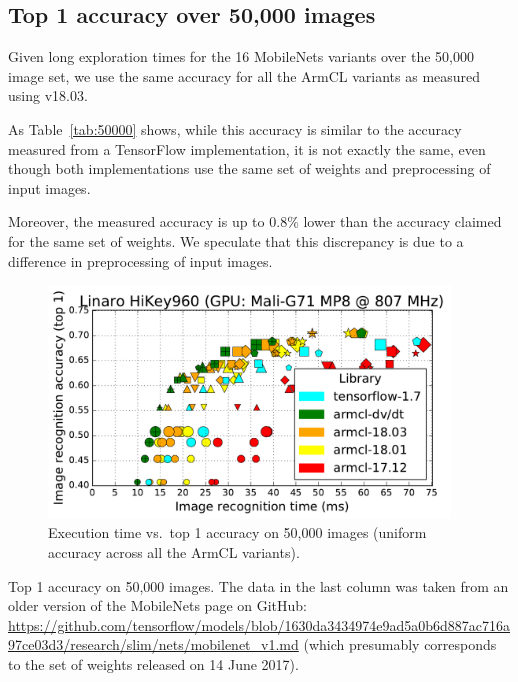 \documentclass[sigplan]{acmart}
\begin{document}
\subsection{Top 1 accuracy over 50,000 images}

Given long exploration times for the 16 MobileNets variants over the 50,000
image set, we use the same accuracy for all the ArmCL variants as measured
using v18.03.

As Table~\ref{tab:50000} shows, while this accuracy is similar to the accuracy
measured from a TensorFlow implementation, it is not exactly the same, even
though both implementations use the same set of weights and
preprocessing of input images.
 
Moreover, the measured accuracy is up to $0.8\%$ lower than the accuracy
claimed for the same set of weights.
%
We speculate that this discrepancy is due to a difference in preprocessing of
input images.

\begin{figure}[htbp]
  \centering
  \includegraphics[width=0.95\textwidth]{figures/hikey-960-accuracy_top1_-50000-dv_dt__18_03__18_01__17_12__tf.pdf}
  \caption{Execution time vs.\ top 1 accuracy on 50,000 images (uniform accuracy across all the ArmCL variants).}
  \label{fig:50000}
\end{figure}


\begin{table}[htbp]
  \centering
  
  \caption{Top 1 accuracy on 50,000 images. The data in the last column was taken from an older version of the MobileNets page on GitHub: \url{https://github.com/tensorflow/models/blob/1630da3434974e9ad5a0b6d887ac716a97ce03d3/research/slim/nets/mobilenet_v1.md} (which presumably corresponds to the set of weights released on 14 June 2017).}
  \label{tab:50000}
\end{table}
\end{document}

